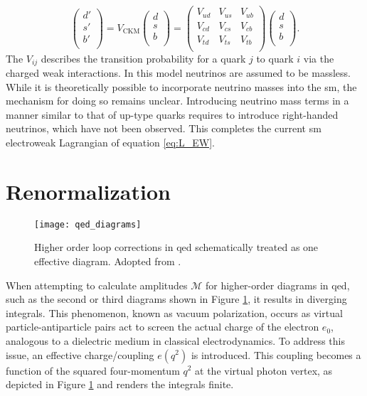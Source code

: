 \begin{equation}
    \begin{pmatrix}
        d' \\
        s' \\
        b' \\
    \end{pmatrix}
    =V_\mathrm{CKM}\begin{pmatrix}
        d \\
        s \\
        b \\
    \end{pmatrix}=
    \begin{pmatrix}
        V_{ud} & V_{us} & V_{ub} \\
        V_{cd} & V_{cs} & V_{cb} \\
        V_{td} & V_{ts} & V_{tb} \\
    \end{pmatrix}
    \begin{pmatrix}
        d \\
        s \\
        b \\
    \end{pmatrix}.
\end{equation}
The $V_{ij}$ describes the transition probability for a quark $j$ to quark $i$ via the charged weak interactions. In this model neutrinos are assumed to be massless. While it is theoretically possible to incorporate neutrino masses into the \ac{sm}, the mechanism for doing so remains unclear. Introducing neutrino mass terms in a manner similar to that of up-type quarks requires to introduce right-handed neutrinos, which have not been observed. This completes the current \ac{sm} electroweak Lagrangian of equation \ref{eq:L_EW}.

\section{Renormalization}\label{sec:renormalization}
\begin{figure}
    \centering
    \texttt{[image: qed\_diagrams]}
    \caption[]{Higher order loop corrections in \ac{qed} schematically treated as one effective diagram. Adopted from \citep{thomson2013modern}.}
    \label{fig:qed_diagrams}
\end{figure}
When attempting to calculate amplitudes $\mathcal{M}$ for higher-order diagrams in \ac{qed}, such as the second or third diagrams shown in Figure \ref{fig:qed_diagrams}, it results in diverging integrals. This phenomenon, known as vacuum polarization, occurs as virtual particle-antiparticle pairs act to screen the actual charge of the electron $e_0$, analogous to a dielectric medium in classical electrodynamics. To address this issue, an effective charge/coupling $e(q^2)$ is introduced. This coupling becomes a function of the squared four-momentum $q^2$ at the virtual photon vertex, as depicted in Figure \ref{fig:qed_diagrams} and renders the integrals finite.

